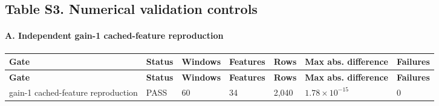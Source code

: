 \documentclass[10pt]{article}
\begin{document}
\clearpage
\begin{landscape}
\section*{Table S3. Numerical validation controls}\label{tab:s3_validation}
\paragraph{A. Independent gain-1 cached-feature reproduction}\begin{longtable}{p{4.0cm}p{1.6cm}p{1.7cm}p{1.7cm}p{1.3cm}p{2.5cm}p{1.7cm}}
\toprule
\textbf{Gate} & \textbf{Status} & \textbf{Windows} & \textbf{Features} & \textbf{Rows} & \textbf{Max abs. difference} & \textbf{Failures} \\
\midrule
\endfirsthead
\toprule
\textbf{Gate} & \textbf{Status} & \textbf{Windows} & \textbf{Features} & \textbf{Rows} & \textbf{Max abs. difference} & \textbf{Failures} \\
\midrule
\endhead
gain-1 cached-feature reproduction & PASS & 60 & 34 & 2,040 & $1.78\times10^{-15}$ & 0 \\
\bottomrule
\end{longtable}

\end{landscape}
\end{document}
